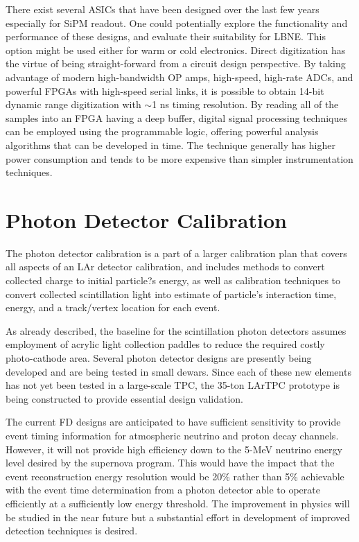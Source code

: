 There exist several ASICs that have been
designed over the last few years especially for SiPM readout.  One
could potentially explore the functionality and performance of these
designs, and evaluate their suitability for LBNE.  This option might
be used either for warm or cold electronics.  Direct digitization has
the virtue of being straight-forward from a circuit design
perspective.  By taking advantage of modern high-bandwidth OP amps,
high-speed, high-rate ADCs, and powerful FPGAs with high-speed serial
links, it is possible to obtain 14-bit dynamic range digitization with
$\sim$1 ns timing resolution.  By reading all of the samples into an
FPGA having a deep buffer, digital signal processing techniques can be
employed using the programmable logic, offering powerful analysis
algorithms that can be developed in time.  The technique generally has
higher power consumption and tends to be more expensive than simpler
instrumentation techniques.

\section{Photon Detector Calibration}
\label{sec_pd_calib}

The photon detector calibration is a part of a larger calibration plan
that covers all aspects of an LAr detector calibration, and includes
methods to convert collected charge to initial particle?s energy, as
well as calibration techniques to convert collected scintillation
light into estimate of particle's interaction time, energy, and a
track/vertex location for each event.  

As already described, the
baseline for the scintillation photon detectors assumes employment of
acrylic light collection paddles to reduce the required costly
photo-cathode area. Several photon detector designs are presently
being developed and are being tested in small dewars. Since each of
these new elements has not yet been tested in a large-scale TPC, the
35-ton LArTPC prototype is being constructed to provide essential
design validation. 

The current FD designs are anticipated to have
sufficient sensitivity to provide event timing information for
atmospheric neutrino and proton decay channels. However, it will not
provide high efficiency down to the 5-MeV neutrino energy level
desired by the supernova program. This would have the impact that the
event reconstruction energy resolution would be 20\% rather than 5\%
achievable with the event time determination from a photon detector
able to operate efficiently at a sufficiently low energy
threshold. The improvement in physics will be studied in the near
future but a substantial effort in development of improved detection
techniques is desired. 

